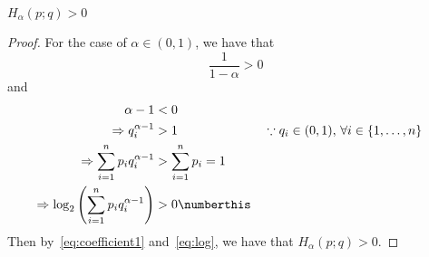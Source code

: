 \documentclass[
  coursecode={MTHE 474},
  assignmentname={Homework \homeworknumber},
  studentnumber=20053722,
  name={Bryan Hoang}
]{
  ltxanswer%
}
\begin{document}
  \begin{questions}
    \setcounter{question}{\questionnumber}
    \addtocounter{question}{-1}
    \question\
    \begin{parts}
      \part{}
      \begin{solution}
        \begin{claim}
          \(H_{\alpha}(p;q) > 0\)
        \end{claim}
        \begin{proof}
          For the case of \(\alpha \in (0, 1)\), we have that
          \begin{equation}\label{eq:coefficient1}
            \frac{1}{1-\alpha} > 0
          \end{equation}
          and
          \begin{align*}
            \alpha - 1                                                                                                                                                               &< 0                                                                                        \\
            \Rightarrow q_{i}^{\alpha-1}                                                                                                                                             &> 1                          & &\because q_{i} \in (0,1),\, \forall i \in \{1, \dotsc, n\} \\
            \Rightarrow                                                                                                                         \sum_{i=1}^{n} p_{i}q_{i}^{\alpha-1} &> \sum_{i=1}^{n} p_{i} = 1                                                                 \\
            \Rightarrow \log_{2}\left(\sum_{i=1}^{n} p_{i}q_{i}^{\alpha-1}\right)                                                                                                    &> 0\numberthis\label{eq:log}
          \end{align*}
          Then by~\eqref{eq:coefficient1} and~\eqref{eq:log}, we have that \(H_{\alpha}(p;q) > 0\).


\end{proof}
\end{solution}
\end{parts}
\end{questions}
\end{document}
